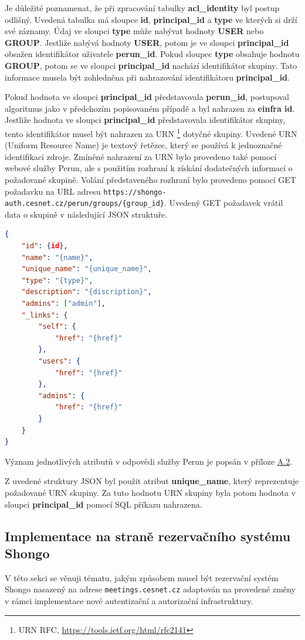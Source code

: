\documentclass[
  printed, %
  twoside, %
  table,   %
  nolof,     %
  nolot,     %
]{fithesis3}
\begin{document}
Je důležité poznamenat, že při zpracování tabulky \textbf{acl\_identity} byl postup odlišný. Uvedená tabulka má sloupce \textbf{id}, \textbf{principal\_id} a \textbf{type} ve kterých si drží své záznamy. Údaj ve sloupci \textbf{type} může nabývat hodnoty \textbf{USER} nebo \textbf{GROUP}. Jestliže nabývá hodnoty \textbf{USER}, potom je ve sloupci \textbf{principal\_id} obsažen identifikátor uživatele \textbf{perun\_id}. Pokud sloupec \textbf{type} obsahuje hodnotu \textbf{GROUP}, potom se ve sloupci \textbf{principal\_id} nachází identifikátor skupiny. Tato informace musela být zohledněna při nahrazování identifikátoru \textbf{principal\_id}. 
\par 
Pokud hodnota ve sloupci \textbf{principal\_id} představovala \textbf{perun\_id}, postupoval algoritmus jako v předchozím popisovaném případě a byl nahrazen za \textbf{einfra id}. Jestliže hodnota ve sloupci \textbf{principal\_id} představovala identifikátor skupiny, tento identifikátor musel být nahrazen za URN \footnote{URN RFC, \url{https://tools.ietf.org/html/rfc2141}} dotyčné skupiny. Uvedené URN (Uniform Resource Name) je textový řetězec, který se používá k jednoznačné identifikaci zdroje. Zmíněné nahrazení za URN bylo provedeno také pomocí webové služby Perun, ale s použitím rozhraní k získání dodatečných informací o požadované skupině. Volání představeného rozhraní bylo provedeno pomocí GET požadavku na URL adresu  \texttt{https://shongo-auth.cesnet.cz/perun/groups/\{group\_id\}}. Uvedený GET požadavek vrátil data o skupině v následující JSON struktuře.   
\begin{lstlisting}[language=json,firstnumber=1]
{
    "id": {id},
    "name": "{name}",
    "unique_name": "{unique_name}",
    "type": "{type}",
    "description": "{discription}",
    "admins": ["admin"],
    "_links": {
        "self": {
            "href": "{href}"
        },
        "users": {
            "href": "{href}"
        },
        "admins": {
            "href": "{href}"
        }
    }
}
\end{lstlisting}
Význam jednotlivých atributů v odpovědi služby Perun je popsán v příloze \hyperref[table:perunws:group]{A.2}. 
\par
Z uvedené struktury JSON byl použit atribut \textbf{unique\_name}, který reprezentuje požadované URN skupiny. Za tuto hodnotu URN skupiny byla potom hodnota v sloupci \textbf{principal\_id} pomocí SQL příkazu nahrazena. 

\subsection{Implementace na straně rezervačního systému Shongo}
\label{ShongoImpl-web}
V této sekci se věnuji tématu, jakým způsobem musel být rezervační systém Shongo nasazený na adrese \texttt{meetings.cesnet.cz} adaptován na provedené změny v rámci implementace nové autentizační a autorizační infrastruktury. 
\par
\end{document}
